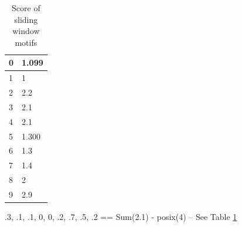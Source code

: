 
\begin{table}[H]
    \centering
    \caption{Score of sliding window motifs} \label{wrapTable:pssm-score}
    \begin{tabular}{|l|l|}
    \hline
    
    0 & 1.099 \\ \hline
    1 & 1 \\ \hline
    2 & 2.2 \\ \hline
    3 & 2.1 \\ \hline
    4 & 2.1 \\ \hline
    5 & 1.300 \\ \hline
    6 & 1.3 \\ \hline
    7 & 1.4 \\ \hline
    8 & 2 \\ \hline
    9 & 2.9 \\ \hline
    
    \end{tabular}
\end{table}

.3, .1, .1, 0, 0, .2, .7, .5, .2  == Sum(2.1) - posix(4) -- See Table \ref{wrapTable:pssm-score}

